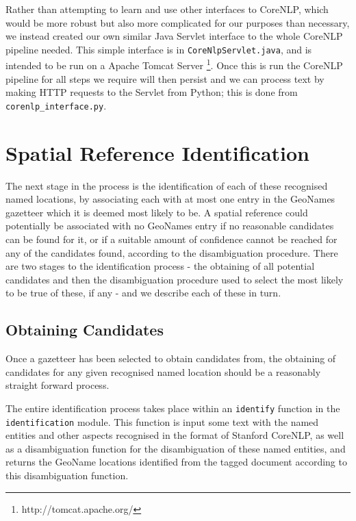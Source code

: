 \documentclass[12pt, a4paper]{report}
\begin{document}
Rather than attempting to learn and use other interfaces to CoreNLP, which would be more robust but also more complicated for our purposes than necessary, we instead created our own similar Java Servlet interface to the whole CoreNLP pipeline needed. This simple interface is in \verb#CoreNlpServlet.java#, and is intended to be run on a Apache Tomcat Server \footnote{http://tomcat.apache.org/}. Once this is run the CoreNLP pipeline for all steps we require will then persist and we can process text by making HTTP requests to the Servlet from Python; this is done from \verb#corenlp_interface.py#.



\section{Spatial Reference Identification}
\label{sec_spatial_reference_identification}

The next stage in the process is the identification of each of these recognised named locations, by associating each with at most one entry in the GeoNames gazetteer which it is deemed most likely to be. A spatial reference could potentially be associated with no GeoNames entry if no reasonable candidates can be found for it, or if a suitable amount of confidence cannot be reached for any of the candidates found, according to the disambiguation procedure. There are two stages to the identification process - the obtaining of all potential candidates and then the disambiguation procedure used to select the most likely to be true of these, if any - and we describe each of these in turn.

\subsection{Obtaining Candidates}

Once a gazetteer has been selected to obtain candidates from, the obtaining of candidates for any given recognised named location should be a reasonably straight forward process.

The entire identification process takes place within an \verb#identify# function in the \verb#identification# module. This function is input some text with the named entities and other aspects recognised in the format of Stanford CoreNLP, as well as a disambiguation function for the disambiguation of these named entities, and returns the GeoName locations identified from the tagged document according to this disambiguation function.
\end{document}
